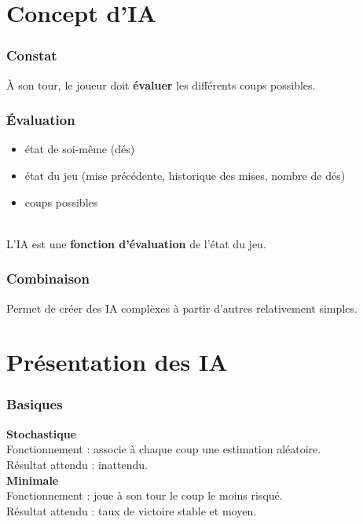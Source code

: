 \documentclass{beamer}
\begin{document}
\section{Concept d'IA}

\begin{frame}
  \frametitle{Constat}

  À son tour, le joueur doit \textbf{évaluer} les différents coups possibles.
  \\[1.5cm]
  \begin{center}
  \end{center}
\end{frame}

\begin{frame}
  \frametitle{Évaluation}

  \begin{itemize}
    \item état de soi-même (dés)
    \item état du jeu (mise précédente, historique des mises, nombre de dés)
    \item coups possibles
  \end{itemize}

  \\[1cm]
  \large L'IA est une \textbf{fonction d'évaluation} de l'état du jeu.
\end{frame}

\begin{frame}
  \frametitle{Combinaison}

  \begin{large}
    Permet de créer des IA complèxes à partir d'autres relativement simples.
    \\[1cm]
  \end{large}
\end{frame}

\section{Présentation des IA}

\begin{frame}
  \frametitle{Basiques}

  \textbf{Stochastique}
  \\
  Fonctionnement : associe à chaque coup une estimation aléatoire.
  \\
  Résultat attendu : inattendu.
  \\[1cm]
  \textbf{Minimale}
  \\
  Fonctionnement : joue à son tour le coup le moins risqué.
  \\
  Résultat attendu : taux de victoire stable et moyen.
\end{frame}
\end{document}
